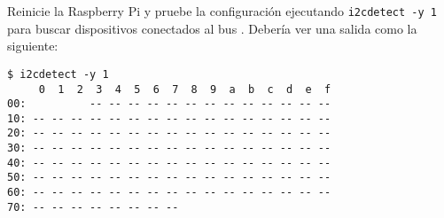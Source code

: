 Reinicie la Raspberry Pi y pruebe la configuración ejecutando \texttt{i2cdetect -y 1} para buscar dispositivos conectados al bus \IIC.
Debería ver una salida como la siguiente:

\begin{Verbatim}
$ i2cdetect -y 1
     0  1  2  3  4  5  6  7  8  9  a  b  c  d  e  f
00:          -- -- -- -- -- -- -- -- -- -- -- -- --
10: -- -- -- -- -- -- -- -- -- -- -- -- -- -- -- --
20: -- -- -- -- -- -- -- -- -- -- -- -- -- -- -- --
30: -- -- -- -- -- -- -- -- -- -- -- -- -- -- -- --
40: -- -- -- -- -- -- -- -- -- -- -- -- -- -- -- --
50: -- -- -- -- -- -- -- -- -- -- -- -- -- -- -- --
60: -- -- -- -- -- -- -- -- -- -- -- -- -- -- -- --
70: -- -- -- -- -- -- -- --
\end{Verbatim}
